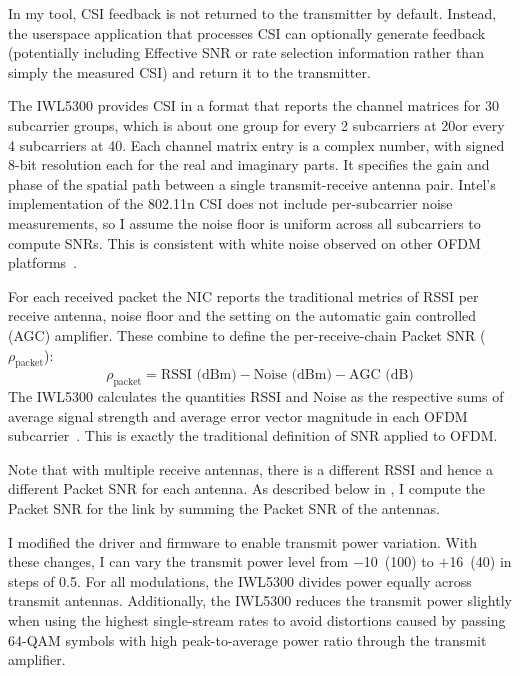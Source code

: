 In my tool, CSI feedback is not returned to the transmitter by default. Instead, the userspace application that processes CSI can optionally generate feedback (potentially including Effective SNR or rate selection information rather than simply the measured CSI) and return it to the transmitter.

The IWL5300 provides CSI in a format that reports the channel matrices for 30 subcarrier groups, which is about one group for every 2 subcarriers at 20\MHz or every 4 subcarriers at 40\MHz. Each channel matrix entry is a complex number, with signed 8-bit resolution each for the real and imaginary parts. It specifies the gain and phase of the spatial path between a single transmit-receive antenna pair. Intel's implementation of the 802.11n CSI does not include per-subcarrier noise measurements, so I assume the noise floor is uniform across all subcarriers to compute SNRs. This is consistent with white noise observed on other OFDM platforms~\cite{Rahul_FARA}.

For each received packet the NIC reports the traditional metrics of RSSI per receive antenna, noise floor and the setting on the automatic gain controlled (AGC) amplifier. These combine to define the per-receive-chain Packet SNR ($\rho_{\text{packet}}$):
\begin{equation}
\label{eq:per_chain_snr}
	\rho_{\text{packet}} = \text{RSSI (dBm)} - \text{Noise (dBm)} - \text{AGC (dB)}
\end{equation}
The IWL5300 calculates the quantities RSSI and Noise as the respective sums of average signal strength and average error vector magnitude in each OFDM subcarrier~\cite{iwlwifi}. This is exactly the traditional definition of SNR applied to OFDM.

Note that with multiple receive antennas, there is a different RSSI and hence a different Packet SNR for each antenna. As described below in , I compute the Packet SNR for the link by summing the Packet SNR of the antennas.

 I modified the driver and firmware to enable transmit power variation. With these changes, I can vary the transmit power level from $-$10\dBm~(100\uW) to $+$16\dBm~(40\mW) in steps of 0.5\dB. For all modulations, the IWL5300 divides power equally across transmit antennas. Additionally, the IWL5300 reduces the transmit power slightly when using the highest single-stream rates to avoid distortions caused by passing 64-QAM symbols with high peak-to-average power ratio through the transmit amplifier.

